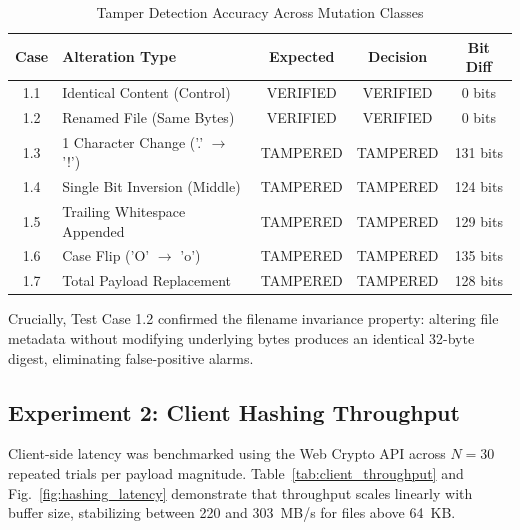 \documentclass[10pt,conference,letterpaper]{IEEEtran}
\begin{document}
\begin{table}[htbp]
\centering
\caption{Tamper Detection Accuracy Across Mutation Classes}
\label{tab:tamper_accuracy}
\footnotesize
\setlength{\tabcolsep}{3pt}
\begin{tabular}{clccc}
\toprule
\textbf{Case} & \textbf{Alteration Type} & \textbf{Expected} & \textbf{Decision} & \textbf{Bit Diff} \\
\midrule
1.1 & Identical Content (Control) & VERIFIED & VERIFIED & 0 bits \\
1.2 & Renamed File (Same Bytes) & VERIFIED & VERIFIED & 0 bits \\
1.3 & 1 Character Change ('.' $\to$ '!') & TAMPERED & TAMPERED & 131 bits \\
1.4 & Single Bit Inversion (Middle) & TAMPERED & TAMPERED & 124 bits \\
1.5 & Trailing Whitespace Appended & TAMPERED & TAMPERED & 129 bits \\
1.6 & Case Flip ('O' $\to$ 'o') & TAMPERED & TAMPERED & 135 bits \\
1.7 & Total Payload Replacement & TAMPERED & TAMPERED & 128 bits \\
\bottomrule
\end{tabular}
\end{table}

Crucially, Test Case 1.2 confirmed the filename invariance property: altering file metadata without modifying underlying bytes produces an identical 32-byte digest, eliminating false-positive alarms.

\subsection{Experiment 2: Client Hashing Throughput}
Client-side latency was benchmarked using the Web Crypto API across $N = 30$ repeated trials per payload magnitude. Table~\ref{tab:client_throughput} and Fig.~\ref{fig:hashing_latency} demonstrate that throughput scales linearly with buffer size, stabilizing between 220 and 303~MB/s for files above 64~KB.
\end{document}
